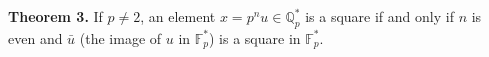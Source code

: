 \textbf{Theorem 3.} If $p \neq 2$, an element $x = p^n u \in \mathbb{Q}_p^*$ is a square if and only if $n$ is even and $\bar{u}$ (the image of $u$ in $\mathbb{F}_p^*$) is a square in $\mathbb{F}_p^*$.
